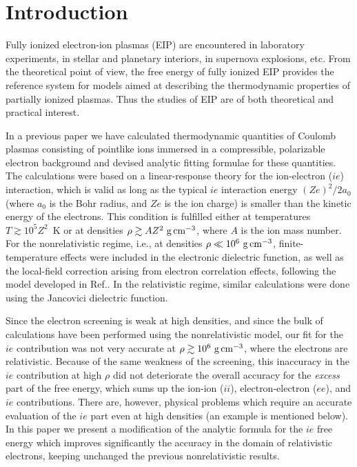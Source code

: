 
\section{Introduction}
Fully ionized electron-ion plasmas (EIP)
are encountered in laboratory experiments, in stellar and planetary
interiors, in supernova explosions, etc.
From the theoretical point of view, 
the free energy of fully ionized EIP provides 
the reference system for 
models aimed at describing the thermodynamic properties 
of partially ionized plasmas. 
Thus the studies of EIP are of both theoretical and practical interest.

In a previous paper \cite{CP98} we have 
calculated thermodynamic quantities of Coulomb plasmas
consisting of pointlike ions immersed in a compressible,
polarizable electron background
and devised analytic fitting formulae for these quantities.
The calculations were based on a linear-response theory 
for the ion-electron ($ie$) interaction, which is valid as long as 
the typical $ie$ interaction energy $(Ze)^2/2a_0$
(where $a_0$ is the Bohr radius, and $Ze$ is the ion charge)
is smaller than the kinetic energy of the electrons. 
This condition is fulfilled either at temperatures $T\gtrsim10^5Z^2$~K
or at densities $\rho\gtrsim AZ^2{\rm~g\,cm}^{-3}$,
where $A$ is the ion mass number.
For the nonrelativistic regime, i.e., at densities $\rho\ll10^6{\rm~g\,cm}^{-3}$, finite-temperature effects were included 
in the electronic dielectric function,
as well as the local-field correction
arising from electron correlation effects,
following the model developed in
Ref.\cite{C90}. In the relativistic regime,
similar calculations were done using the Jancovici \cite{Janco}
dielectric function.

Since the electron screening is weak at high densities,
and since the bulk of calculations have been performed
using the nonrelativistic model,
our fit for the 
$ie$ contribution was not very accurate at $\rho\gtrsim10^6{\rm~g\,cm}^{-3}$,
where the electrons are relativistic.
Because of the same weakness of the screening,
this inaccuracy in the $ie$ contribution at high $\rho$
did not deteriorate the overall
accuracy for the {\em excess\/} part of the 
free energy, which sums up the ion-ion ($ii$),
electron-electron ($ee$), and $ie$ contributions.
There are, however, physical problems which require 
an accurate evaluation of
the $ie$ part even at high densities
(an example is mentioned below).
In this paper we present a modification
of the analytic formula \cite{CP98} for the $ie$ free energy
which improves significantly the accuracy in the domain of 
relativistic electrons,
keeping unchanged the previous nonrelativistic results.

